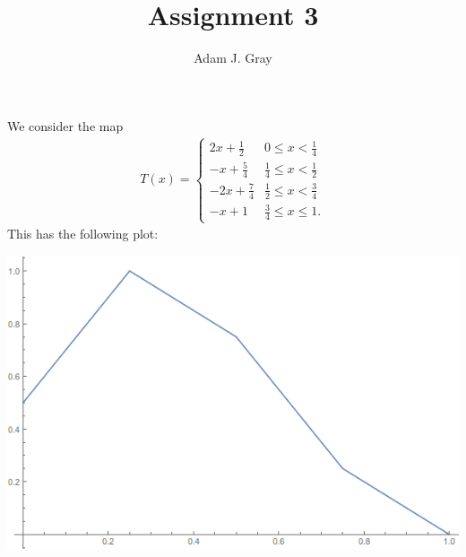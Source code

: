 \documentclass{unswmaths}
\begin{document}
\author{Adam J. Gray}
\title{Assignment 3}
\subject{Ergodic Theory}

\unswtitle

\section{}
    We consider the map
    \begin{align}
        T(x) = 
        \begin{cases}
            2x + \frac{1}{2} & 0 \leq x < \frac{1}{4} \\
            -x + \frac{5}{4} & \frac{1}{4} \leq x < \frac{1}{2} \\
            -2x + \frac{7}{4} & \frac{1}{2} \leq x < \frac{3}{4} \\
            -x + 1 & \frac{3}{4} \leq x \leq 1.
        \end{cases}
    \end{align}
    This has the following plot:
    
    \includegraphics[scale=0.5]{qn_1_map}
\end{document}
